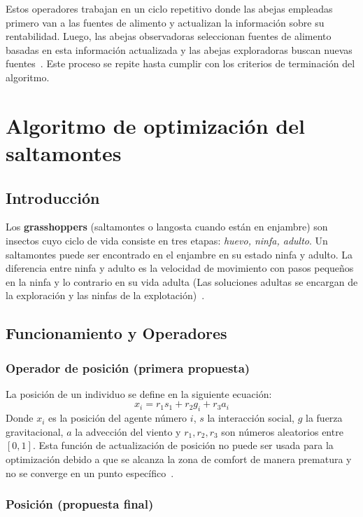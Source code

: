 Estos operadores trabajan en un ciclo repetitivo donde las abejas empleadas primero van a las fuentes de alimento y actualizan la información sobre su rentabilidad. Luego, las abejas observadoras seleccionan fuentes de alimento basadas en esta información actualizada y las abejas exploradoras buscan nuevas fuentes~\cite{karaboga_idea_nodate}. Este proceso se repite hasta cumplir con los criterios de terminación del algoritmo.

\section{Algoritmo de optimización del saltamontes}
\subsection{Introducción}
Los \textbf{grasshoppers} (saltamontes o langosta cuando están en enjambre) son insectos cuyo ciclo de vida consiste en tres etapas: \textit{huevo, ninfa, adulto}. Un saltamontes puede ser encontrado en el enjambre en su estado ninfa y adulto. La diferencia entre ninfa y adulto es la velocidad de movimiento con pasos pequeños en la ninfa y lo contrario en su vida adulta (Las soluciones adultas se encargan de la exploración y las ninfas de la explotación)~\cite{saremi_grasshopper_2017}.
\subsection{Funcionamiento y Operadores}
\subsubsection{Operador de posición (primera propuesta)}
La posición de un individuo se define en la siguiente ecuación:
\begin{equation}
    x_i = r_1s_1+r_2g_i+r_3a_i
\end{equation}
Donde $x_i$ es la posición del agente número $i$, $s$ la interacción social, $g$ la fuerza gravitacional, $a$ la advección del viento y $r_1, r_2, r_3$ son números aleatorios entre $[0,1]$.
Esta función de actualización de posición no puede ser usada para la optimización debido a que se alcanza la zona de comfort de manera prematura y no se converge en un punto específico~\cite{saremi_grasshopper_2017}.

\subsubsection{Posición (propuesta final)}


